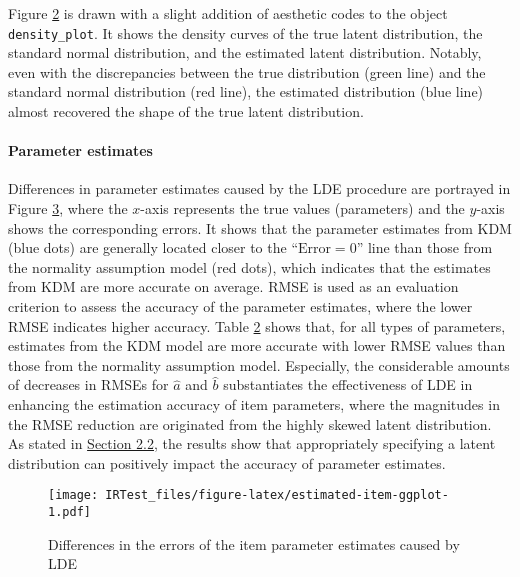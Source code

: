 Figure \protect\hyperlink{fig:estimated-density-latex}{2} is drawn with a slight addition
of aesthetic codes to the object \texttt{density\_plot}. It shows the density
curves of the true latent distribution, the standard normal
distribution, and the estimated latent distribution. Notably, even with
the discrepancies between the true distribution ({green
line}) and the standard normal distribution ({red
line}), the estimated distribution ({blue
line}) almost recovered the shape of the true
latent distribution.

\hypertarget{parameter-estimates}{%
\paragraph{Parameter estimates}\label{parameter-estimates}}

Differences in parameter estimates caused by the LDE procedure are
portrayed in Figure \protect\hyperlink{fig:estimated-item-ggplot}{3}, where the \(x\)-axis represents
the true values (parameters) and the \(y\)-axis shows the corresponding
errors. It shows that the parameter estimates from KDM ({blue
dots}) are generally located closer to the
``\(\text{Error} = 0\)'' line than those from the normality assumption model
({red dots}), which indicates that the estimates
from KDM are more accurate on average. RMSE is used as an evaluation
criterion to assess the accuracy of the parameter estimates, where the
lower RMSE indicates higher accuracy. Table
\protect\hyperlink{tab:rmse-static}{2}
shows that, for all types of parameters, estimates from the KDM model
are more accurate with lower RMSE values than those from the normality
assumption model. Especially, the considerable amounts of decreases in
RMSEs for \(\hat{a}\) and \(\hat{b}\) substantiates the effectiveness of LDE
in enhancing the estimation accuracy of item parameters, where the
magnitudes in the RMSE reduction are originated from the highly skewed
latent distribution. As stated in \protect\hyperlink{role-of-latent-distribution}{Section
2.2}, the results show that appropriately
specifying a latent distribution can positively impact the accuracy of
parameter estimates.

\begin{figure}
\hypertarget{fig:estimated-item-ggplot}{%
\centering
\texttt{[image: IRTest\_files/figure-latex/estimated-item-ggplot-1.pdf]}
\caption{Differences in the errors of the item parameter estimates caused by
LDE}\label{fig:estimated-item-ggplot}
}
\end{figure}


